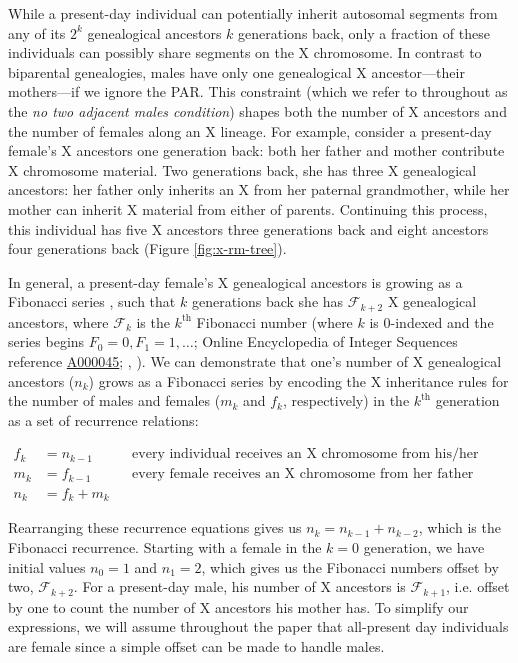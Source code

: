 \documentclass[11pt]{article}
\begin{document}
While a present-day individual can potentially inherit autosomal segments from
any of its $2^k$ genealogical ancestors $k$ generations back, only a fraction
of these individuals can possibly share segments on the X chromosome. In
contrast to biparental genealogies, males have only one genealogical X
ancestor---their mothers---if we ignore the PAR. This constraint (which we
refer to throughout as the \emph{no two adjacent males condition}) shapes both
the number of X ancestors and the number of females along an X lineage. For
example, consider a present-day female's X ancestors one generation back: both
her father and mother contribute X chromosome material. Two generations back,
she has three X genealogical ancestors: her father only inherits an X from her
paternal grandmother, while her mother can inherit X material from either of
parents. Continuing this process, this individual has five X ancestors three
generations back and eight ancestors four generations back (Figure
\ref{fig:x-rm-tree}). 


In general, a present-day female's X genealogical ancestors is growing as a
Fibonacci series \citep{laughlin1920calculating, Basin:1963wf}, such that $k$
generations back she has $\mathcal{F}_{k+2}$ X genealogical ancestors, where
$\mathcal{F}_k$ is the $k^\text{th}$ Fibonacci number (where $k$ is 0-indexed
and the series begins $F_0 = 0, F_1 = 1, \ldots$; Online Encyclopedia of
Integer Sequences reference \href{https://oeis.org/A000045}{A000045};
\citeauthor{sloane2014online}, \citeyear{sloane2014online}). We can demonstrate
that one's number of X genealogical ancestors ($n_k$) grows as a Fibonacci
series by encoding the X inheritance rules for the number of males and females
($m_k$ and $f_k$, respectively) in the $k^\text{th}$ generation as a set of
recurrence relations:

\begin{align*}
  f_k &= n_{k-1} && \text{every individual receives an X chromosome from his/her mother}\\
  m_k &= f_{k-1} && \text{every female receives an X chromosome from her father}\\
  n_k &= f_k + m_k
\end{align*}

Rearranging these recurrence equations gives us $n_k = n_{k-1} + n_{k-2}$,
which is the Fibonacci recurrence. Starting with a female in the $k=0$
generation, we have initial values $n_0=1$ and $n_1 = 2$, which gives us the
Fibonacci numbers offset by two, $\mathcal{F}_{k+2}$. For a present-day male,
his number of X ancestors is $\mathcal{F}_{k+1}$, i.e. offset by one to count
the number of X ancestors his mother has. To simplify our expressions, we will
assume throughout the paper that all-present day individuals are female since a
simple offset can be made to handle males.
\end{document}
